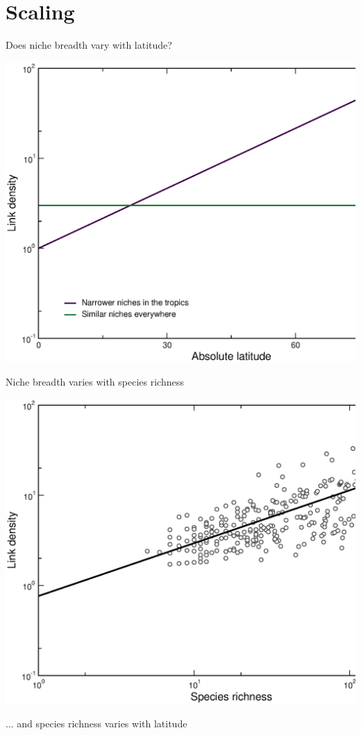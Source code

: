 \documentclass{beamer}
\begin{document}
\section*{Scaling}
  \begin{frame}{Does niche breadth vary with latitude?}

    \begin{center}
      \includegraphics*[width=.8\textwidth]{Figures/results/ls_vs_lat_simulated.eps}
    \end{center}

  \end{frame}


  \begin{frame}{Niche breadth varies with species richness}

    \begin{center}
      \includegraphics*[width=.8\textwidth]{Figures/results/LS_vs_S_fitline_observed.eps}

    \vspace{.5cm}
    {\color{white}... and species richness varies with latitude}
    \end{center}


  \end{frame}
\end{document}
